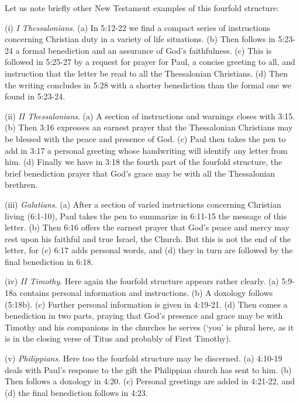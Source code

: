 Let us note briefly other New Testament examples of this fourfold structure:
\newline

(i) {\it I Thessalonians}.
(a) In 5:12-22 we find a compact series of instructions concerning Christian
duty in a variety of life situations.
(b) Then follows in 5:23-24 a formal benediction and an assurance of God's
faithfulness.
(c) This is followed in 5:25-27 by a request for prayer for Paul, a concise
greeting to all, and instruction that the letter be read to all the Thessalonian
Christians.
(d) Then the writing concludes in 5:28 with a shorter benediction than the
formal one we found in 5:23-24.
\newline

(ii) {\it II Thessalonians}.
(a) A section of instructions and warnings closes with 3:15.
(b) Then 3:16 expresses an earnest prayer that the Thessalonian Christians may
be blessed with the peace and presence of God.
(c) Paul then takes the pen to add in 3:17 a personal greeting whose handwriting
will identify any letter  from him.
(d) Finally we have in 3:18 the fourth part of the fourfold structure, the brief
benediction prayer that God's grace may be with all the Thessalonian brethren.
\newline

(iii) {\it Galatians}.
(a) After a section of varied instructions concerning Christian living (6:1-10),
Paul takes the pen to summarize in 6:11-15 the message of this letter.
(b) Then 6:16 offers the earnest prayer that God's peace and mercy may rest upon
his faithful and true Israel, the Church.
But this is not the end of the letter, for
(c) 6:17 adds personal words, and
(d) they in turn are followed by the final benediction in 6:18.
\newline

(iv) {\it II Timothy}.
Here again the fourfold structure appears rather clearly.
(a) 5:9-18a contains personal information and instructions.
(b) A doxology follows (5:18b).
(c) Further personal information is given in 4:19-21.
(d) Then comes a benediction in two parts, praying that God's presence and grace
may be with Timothy and his companions in the churches he serves (`you' is
plural here, as it is in the closing verse of Titus and probably of First
Timothy).
\newline

(v) {\it Philippians}.
Here too the fourfold structure may be discerned.
(a) 4:10-19 deals with Paul's response to the gift the Philippian church has
sent to him.
(b) Then follows a doxology in 4:20.
(c) Personal greetings are added in 4:21-22, and
(d) the final benediction follows in 4:23.
\newline

